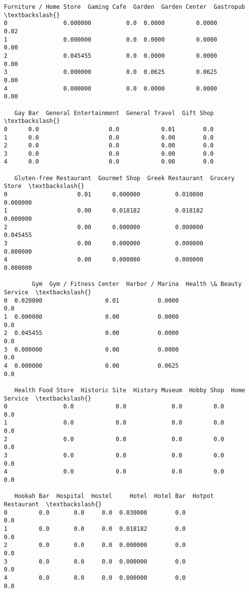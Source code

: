 \documentclass[11pt]{article}
\begin{document}
\begin{tcolorbox}[breakable, size=fbox, boxrule=.5pt, pad at break*=1mm, opacityfill=0]
\begin{Verbatim}[commandchars=\\\{\}]
   Furniture / Home Store  Gaming Cafe  Garden  Garden Center  Gastropub  \textbackslash{}
0                0.000000          0.0  0.0000         0.0000       0.02
1                0.000000          0.0  0.0000         0.0000       0.00
2                0.045455          0.0  0.0000         0.0000       0.00
3                0.000000          0.0  0.0625         0.0625       0.00
4                0.000000          0.0  0.0000         0.0000       0.00

   Gay Bar  General Entertainment  General Travel  Gift Shop  \textbackslash{}
0      0.0                    0.0            0.01        0.0
1      0.0                    0.0            0.00        0.0
2      0.0                    0.0            0.00        0.0
3      0.0                    0.0            0.00        0.0
4      0.0                    0.0            0.00        0.0

   Gluten-free Restaurant  Gourmet Shop  Greek Restaurant  Grocery Store  \textbackslash{}
0                    0.01      0.000000          0.010000       0.000000
1                    0.00      0.018182          0.018182       0.000000
2                    0.00      0.000000          0.000000       0.045455
3                    0.00      0.000000          0.000000       0.000000
4                    0.00      0.000000          0.000000       0.000000

        Gym  Gym / Fitness Center  Harbor / Marina  Health \& Beauty Service  \textbackslash{}
0  0.020000                  0.01           0.0000                      0.0
1  0.000000                  0.00           0.0000                      0.0
2  0.045455                  0.00           0.0000                      0.0
3  0.000000                  0.00           0.0000                      0.0
4  0.000000                  0.00           0.0625                      0.0

   Health Food Store  Historic Site  History Museum  Hobby Shop  Home Service  \textbackslash{}
0                0.0            0.0             0.0         0.0           0.0
1                0.0            0.0             0.0         0.0           0.0
2                0.0            0.0             0.0         0.0           0.0
3                0.0            0.0             0.0         0.0           0.0
4                0.0            0.0             0.0         0.0           0.0

   Hookah Bar  Hospital  Hostel     Hotel  Hotel Bar  Hotpot Restaurant  \textbackslash{}
0         0.0       0.0     0.0  0.030000        0.0                0.0
1         0.0       0.0     0.0  0.018182        0.0                0.0
2         0.0       0.0     0.0  0.000000        0.0                0.0
3         0.0       0.0     0.0  0.000000        0.0                0.0
4         0.0       0.0     0.0  0.000000        0.0                0.0


\end{Verbatim}
\end{tcolorbox}
\end{document}
